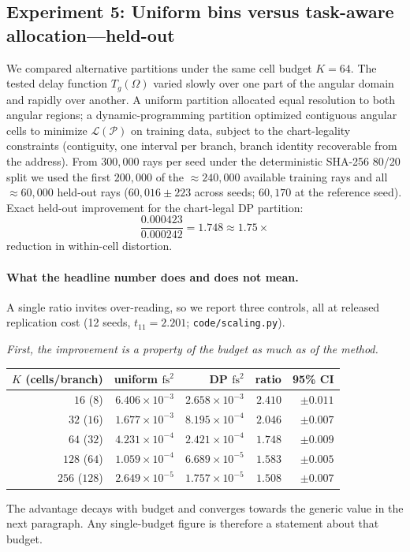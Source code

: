 \documentclass[11pt]{article}
\begin{document}
\subsection{Experiment 5: Uniform bins versus task-aware allocation---held-out}

We compared alternative partitions under the same cell budget $K = 64$. The tested delay
function $T_g(\Omega)$ varied slowly over one part of the angular domain and rapidly over
another. A uniform partition allocated equal resolution to both angular regions; a
dynamic-programming partition optimized contiguous angular cells to minimize
$\mathcal{L}(\mathcal{P})$ on training data, subject to the chart-legality constraints
(contiguity, one interval per branch, branch identity recoverable from the address). From
$300{,}000$ rays per seed under the deterministic SHA-256 80/20 split we used the first
$200{,}000$ of the $\approx240{,}000$ available training rays and all
$\approx60{,}000$ held-out rays ($60{,}016\pm223$ across seeds; $60{,}170$ at the
reference seed). Exact held-out improvement for the chart-legal DP partition:
\begin{equation}
\frac{0.000423}{0.000242} = 1.748 \approx \mathbf{1.75\times}
\end{equation}
reduction in within-cell distortion.

\paragraph{What the headline number does and does not mean.}
A single ratio invites over-reading, so we report three controls, all at released
replication cost (12 seeds, $t_{11}=2.201$; \texttt{code/scaling.py}).

\emph{First, the improvement is a property of the budget as much as of the method.}
\begin{center}
\begin{tabular}{rrrrr}
\toprule
$K$ (cells/branch) & uniform $\mathrm{fs}^2$ & DP $\mathrm{fs}^2$ & ratio & 95\% CI \\
\midrule
$16$  ($8$)   & $6.406\times10^{-3}$ & $2.658\times10^{-3}$ & $2.410$ & $\pm 0.011$ \\
$32$  ($16$)  & $1.677\times10^{-3}$ & $8.195\times10^{-4}$ & $2.046$ & $\pm 0.007$ \\
$64$  ($32$)  & $4.231\times10^{-4}$ & $2.421\times10^{-4}$ & $1.748$ & $\pm 0.009$ \\
$128$ ($64$)  & $1.059\times10^{-4}$ & $6.689\times10^{-5}$  & $1.583$ & $\pm 0.005$ \\
$256$ ($128$) & $2.649\times10^{-5}$ & $1.757\times10^{-5}$  & $1.508$ & $\pm 0.007$ \\
\bottomrule
\end{tabular}
\end{center}
The advantage decays with budget and converges towards the generic value in the next
paragraph. Any single-budget figure is therefore a statement about that budget.
\end{document}

